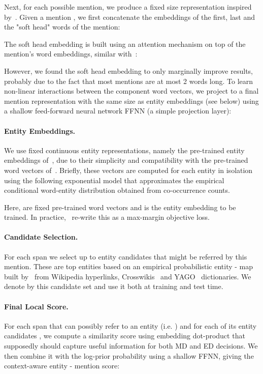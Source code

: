 \documentclass[11pt,a4paper]{article}
\begin{document}
Next, for each possible mention, we produce a fixed size representation inspired by~\citep{lee2017end}. Given a mention , we first concatenate the embeddings of the first, last and the "soft head" words of the mention: 

The soft head embedding  is built using an attention mechanism on top of the mention's word embeddings, similar with~\citep{lee2017end}:

However, we found the soft head embedding to only marginally improve results, probably due to the fact that most mentions are at most 2 words long. To learn non-linear interactions between the component word vectors, we project  to a final mention representation with the same size as entity embeddings (see below) using a shallow feed-forward neural network FFNN (a simple projection layer):


\paragraph{Entity Embeddings.}
We use fixed continuous entity representations, namely the pre-trained entity embeddings of~\citep{ganea2017deep}, due to their simplicity and compatibility with the pre-trained word vectors of~\citep{mikolov2013distributed}. Briefly, these vectors are computed for each entity in isolation using the following exponential model that approximates the empirical conditional word-entity distribution  obtained from co-occurrence counts. 

Here,  are fixed pre-trained word vectors and  is the entity embedding to be trained. In practice,~\citep{ganea2017deep} re-write this as a max-margin objective loss.



\paragraph{Candidate Selection.}
For each span  we select up to  entity candidates that might be referred by this mention. These are top entities based on an empirical probabilistic entity - map  built by~\citep{ganea2017deep} from Wikipedia hyperlinks, Crosswikis~\citep{spitkovsky2012cross} and YAGO~\citep{hoffart2011robust} dictionaries. We denote by  this candidate set and use it both at training and test time.

\paragraph{Final Local Score.}
For each span  that can possibly refer to an entity (i.e. ) and for each of its entity candidates , we compute a similarity score using embedding dot-product that supposedly should capture useful information for both MD and ED decisions. We then combine it with the log-prior probability using a shallow FFNN, giving the context-aware entity - mention score:
\end{document}
